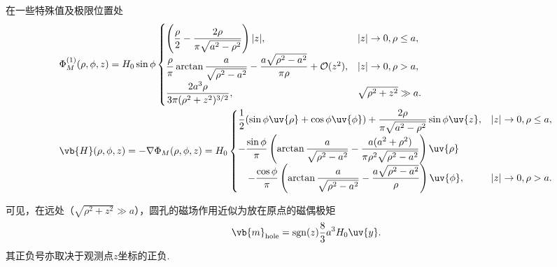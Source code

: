 在一些特殊值及极限位置处
\begin{align*}
	&\Phi_M^{(1)}(\rho, \phi, z) = H_0 \sin\phi
	\begin{cases}
		\left( \dfrac{\rho}{2} - \dfrac{2\rho}{\pi\sqrt{a^2-\rho^2}} \right) |z|,                                       & |z| \to 0, \rho \le a,   \\[8pt]
		\dfrac{\rho}{\pi} \arctan\dfrac{a}{\sqrt{\rho^2-a^2}} - \dfrac{a\sqrt{\rho^2-a^2}}{\pi\rho} + \mathcal{O}(z^2), & |z| \to 0, \rho > a,     \\[8pt]
		\dfrac{2a^3 \rho}{3\pi (\rho^2+z^2)^{3/2}},                                                                     & \sqrt{\rho^2+z^2} \gg a.
	\end{cases}\\
	&\vb{H}(\rho, \phi, z) = -\nabla\Phi_M(\rho, \phi, z) = H_0
	\begin{cases}
		\dfrac12 (\sin\phi \uv{\rho} + \cos\phi \uv{\phi}) + \dfrac{2\rho}{\pi\sqrt{a^2-\rho^2}} \sin\phi \uv{z},                     & |z| \to 0, \rho \le a, \\[8pt]
		-\dfrac{\sin\phi}{\pi} \left( \arctan\dfrac{a}{\sqrt{\rho^2-a^2}} - \dfrac{a(a^2+\rho^2)}{\pi\rho^2\sqrt{\rho^2-a^2}} \right) \uv{\rho}                \\[6pt]
		\quad -\dfrac{\cos\phi}{\pi} \left( \arctan\dfrac{a}{\sqrt{\rho^2-a^2}} - \dfrac{a\sqrt{\rho^2-a^2}}{\rho} \right) \uv{\phi}, & |z| \to 0, \rho > a.
	\end{cases}
\end{align*}

可见，在远处（\(\sqrt{\rho^2+z^2} \gg a\)），圆孔的磁场作用近似为放在原点的磁偶极矩
\begin{align*}
	\vb{m}_{\text{hole}} = \operatorname{sgn}(z) \frac{8}{3} a^3 H_0 \uv{y}.
\end{align*}
其正负号亦取决于观测点\(z\)坐标的正负.

